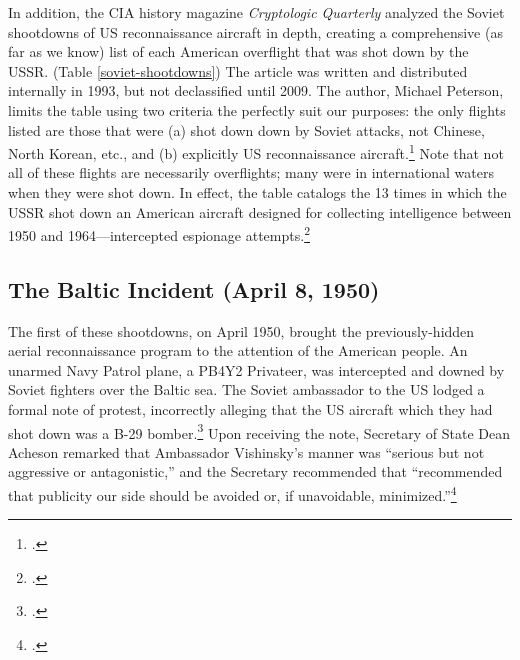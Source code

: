 \documentclass{report}
\begin{document}
\begin{refsegment}
In addition, the CIA history magazine \emph{Cryptologic Quarterly} analyzed the Soviet shootdowns of US reconnaissance aircraft in depth, creating a comprehensive (as far as we know) list of each American overflight that was shot down by the USSR. (Table \ref{soviet-shootdowns}) The article was written and distributed internally in 1993, but not declassified until 2009. The author, Michael Peterson, limits the table using two criteria the perfectly suit our purposes: the only flights listed are those that were (a) shot down down by Soviet attacks, not Chinese, North Korean, etc., and (b) explicitly US reconnaissance aircraft.\footcite[p.~4]{peterson_maybe_1993} Note that not all of these flights are necessarily overflights; many were in international waters when they were shot down. In effect, the table catalogs the 13 times in which the USSR shot down an American aircraft designed for collecting intelligence between 1950 and 1964---intercepted espionage attempts.\footcite[p.~5. In the original document, this table lists the first incident as having taken place over the Barents Sea, not the Baltic Sea. Because the description of the mission---including a map of its route in the same document---takes place entirely over the Baltic sea, I have concluded that this has to be a typographical error, and corrected it here.]{peterson_maybe_1993}

\subsection{The Baltic Incident (April 8, 1950)}

The first of these shootdowns, on April 1950, brought the previously-hidden aerial reconnaissance program to the attention of the American people. An unarmed Navy Patrol plane, a PB4Y2 Privateer, was intercepted and downed by Soviet fighters over the Baltic sea. The Soviet ambassador to the US lodged a formal note of protest, incorrectly alleging that the US aircraft which they had shot down was a B-29 bomber.\footcite{kirk_ambassador_1950} Upon receiving the note, Secretary of State Dean Acheson remarked that Ambassador Vishinsky's manner was ``serious but not aggressive or antagonistic,'' and the Secretary recommended that ``recommended that publicity our side should be avoided or, if unavoidable, minimized.''\footcite{kirk_ambassador_1950}


\end{refsegment}
\end{document}
